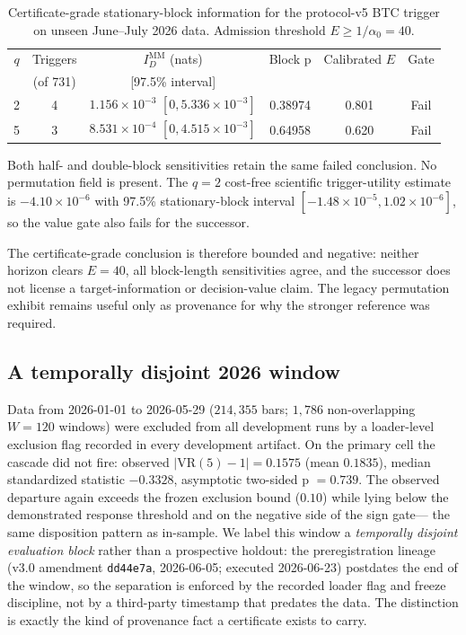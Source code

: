 \documentclass[3p]{elsarticle}
\newcommand{\VR}{\ensuremath{\mathrm{VR}}}
\begin{document}
\begin{table}[htbp]
\centering
\begin{threeparttable}
\caption{Certificate-grade stationary-block information for the protocol-v5
BTC trigger on unseen June--July 2026 data. Admission threshold
$E\ge1/\alpha_0=40$.}
\label{tab:info}
\small
\begin{tabular}{c c c c c c}
\toprule
$q$ & Triggers & $I_D^{\mathrm{MM}}$ (nats) & Block p & Calibrated $E$ & Gate \\
 & (of 731) & [97.5\% interval] & & & \\
\midrule
2 & 4 & $1.156\times10^{-3}$ $[0,5.336\times10^{-3}]$ & 0.38974 & 0.801 & Fail \\
5 & 3 & $8.531\times10^{-4}$ $[0,4.515\times10^{-3}]$ & 0.64958 & 0.620 & Fail \\
\bottomrule
\end{tabular}
\begin{tablenotes}\footnotesize
\item Both half- and double-block sensitivities retain the same failed
conclusion. No permutation field is present. The $q{=}2$ cost-free scientific
trigger-utility estimate is $-4.10\times10^{-6}$ with 97.5\% stationary-block
interval $[-1.48\times10^{-5},1.02\times10^{-6}]$, so the value gate also
fails for the successor.
\end{tablenotes}
\end{threeparttable}
\end{table}

The certificate-grade conclusion is therefore bounded and negative: neither
horizon clears $E=40$, all block-length sensitivities agree, and the successor
does not license a target-information or decision-value claim. The legacy
permutation exhibit remains useful only as provenance for why the stronger
reference was required.

\subsection{A temporally disjoint 2026 window}
\label{sec:holdout}

Data from 2026-01-01 to 2026-05-29 ($214{,}355$ bars; $1{,}786$
non-overlapping $W{=}120$ windows) were excluded from all development runs by
a loader-level exclusion flag recorded in every development artifact. On the
primary cell the cascade did not
fire: observed $|\VR(5)-1|=0.1575$ (mean $0.1835$), median standardized
statistic $-0.3328$, asymptotic two-sided p $=0.739$. The observed departure
again exceeds the frozen exclusion bound ($0.10$) while lying below the
demonstrated response threshold and on the negative side of the sign gate---
the same disposition pattern as in-sample. We label this window a
\emph{temporally disjoint evaluation block} rather than a prospective
holdout: the preregistration lineage (v3.0 amendment \texttt{dd44e7a},
2026-06-05; executed 2026-06-23) postdates the end of the window, so the
separation is enforced by the recorded loader flag and freeze discipline, not
by a third-party timestamp that predates the data. The distinction is
exactly the kind of provenance fact a certificate exists to carry.
\end{document}
